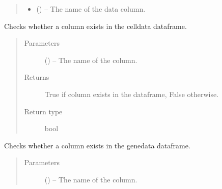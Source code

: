\documentclass[letterpaper,10pt,english]{sphinxmanual}
\begin{document}
\begin{fulllineitems}
\begin{fulllineitems}
\begin{quote}
\begin{description}
\begin{itemize}
\item {} 
 () – The name of the data column.

\end{itemize}

\end{description}\end{quote}

\end{fulllineitems}


\begin{fulllineitems}
\label{\detokenize{index:singlecelldata.SingleCell.checkCellData}}
Checks whether a column exists in the celldata dataframe.
\begin{quote}\begin{description}
\item[{Parameters}] \leavevmode
{} () – The name of the column.

\item[{Returns}] \leavevmode
True if column exists in the dataframe, False otherwise.

\item[{Return type}] \leavevmode
bool

\end{description}\end{quote}

\end{fulllineitems}


\begin{fulllineitems}
\label{\detokenize{index:singlecelldata.SingleCell.checkGeneData}}
Checks whether a column exists in the genedata dataframe.
\begin{quote}\begin{description}
\item[{Parameters}] \leavevmode
{} () – The name of the column.


\end{description}
\end{quote}
\end{fulllineitems}
\end{fulllineitems}
\end{document}
